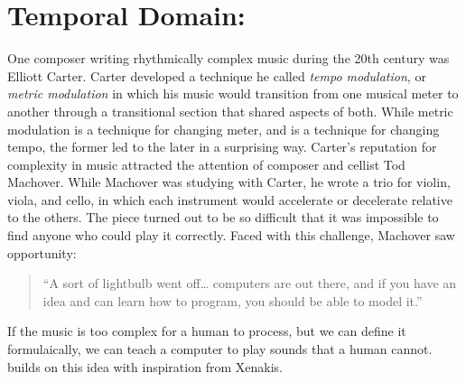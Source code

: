 \clearpage
\chapter{Temporal Domain: \polytempic}
\label{ch:polytempic}

One composer writing rhythmically complex music during the 20th
century was Elliott Carter. Carter developed a technique he called
\textit{tempo modulation}, or \textit{metric modulation} in which his
music would transition from one musical meter to another through a
transitional section that shared aspects of both. While metric
modulation is a technique for changing meter, and \polytempic is a
technique for changing tempo, the former led to the later in a
surprising way. Carter's reputation for complexity in music attracted
the attention of composer and cellist Tod Machover. While Machover was
studying with Carter, he wrote a trio for violin, viola, and cello, in
which each instrument would accelerate or decelerate relative to the
others. The piece turned out to be so difficult that it was impossible
to find anyone who could play it correctly. Faced with this challenge,
Machover saw opportunity:
\begin{quotation}``A sort of lightbulb went off\ldots{} computers are out
  there, and if you have an idea and can learn how to program, you
  should be able to model it.''\cite{Fein2014}
\end{quotation}
If the music is too complex for a human to process, but we can define
it formulaically, we can teach a computer to play sounds that a human
cannot. \polytempic builds on this idea with inspiration from Xenakis.

